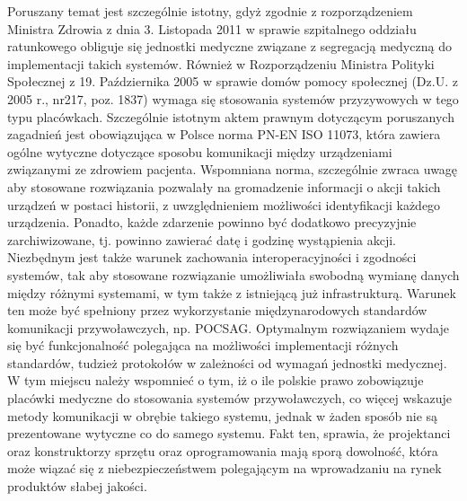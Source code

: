 \documentclass[12pt]{article} %
\begin{document}
Poruszany temat jest szczególnie istotny, gdyż zgodnie z rozporządzeniem Ministra Zdrowia z dnia 3. Listopada 2011 w sprawie szpitalnego oddziału ratunkowego obliguje się jednostki medyczne związane z segregacją medyczną do implementacji takich systemów. Również w Rozporządzeniu Ministra Polityki Społecznej z 19. Października 2005 w sprawie domów pomocy społecznej (Dz.U. z 2005 r., nr217, poz. 1837) wymaga się stosowania systemów przyzywowych w tego typu placówkach. Szczególnie istotnym aktem prawnym dotyczącym poruszanych zagadnień jest obowiązująca w Polsce norma PN-EN ISO 11073, która zawiera ogólne wytyczne dotyczące sposobu komunikacji między urządzeniami związanymi ze zdrowiem pacjenta. Wspomniana norma, szczególnie zwraca uwagę aby stosowane rozwiązania pozwalały na gromadzenie informacji o akcji takich urządzeń w postaci historii, z uwzględnieniem możliwości identyfikacji każdego urządzenia. Ponadto, każde zdarzenie powinno być dodatkowo precyzyjnie zarchiwizowane, tj. powinno zawierać datę i godzinę wystąpienia akcji. Niezbędnym jest także warunek zachowania interoperacyjności i zgodności systemów, tak aby stosowane rozwiązanie umożliwiała swobodną wymianę danych między różnymi systemami, w tym także z istniejącą już infrastrukturą. Warunek ten może być spełniony przez wykorzystanie międzynarodowych standardów komunikacji przywoławczych, np. POCSAG. Optymalnym rozwiązaniem wydaje się być funkcjonalność polegająca na możliwości implementacji różnych standardów, tudzież protokołów w zależności od wymagań jednostki medycznej.
W tym miejscu należy wspomnieć o tym, iż o ile polskie prawo zobowiązuje placówki medyczne do stosowania systemów przywoławczych, co więcej wskazuje metody komunikacji w obrębie takiego systemu, jednak w żaden sposób nie są prezentowane wytyczne co do samego systemu. Fakt ten, sprawia, że projektanci oraz konstruktorzy sprzętu oraz oprogramowania mają sporą dowolność, która może wiązać się z niebezpieczeństwem polegającym na wprowadzaniu na rynek produktów słabej jakości. 


\end{document}
